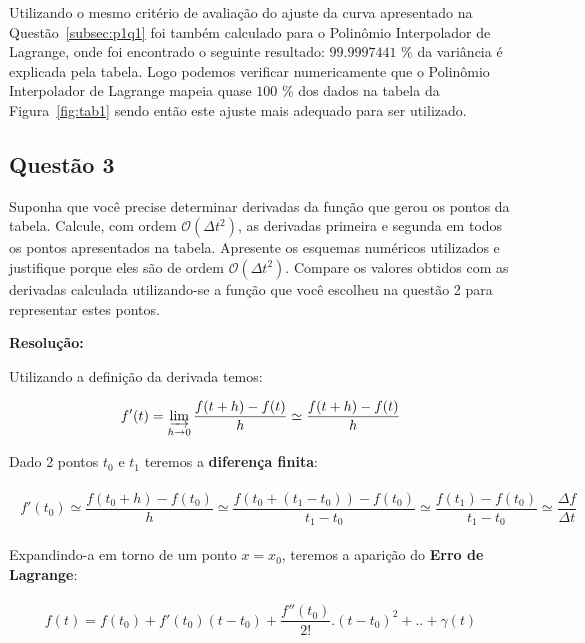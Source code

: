\documentclass[12pt]{article}
\begin{document}
Utilizando o mesmo critério de avaliação do ajuste da curva apresentado na Questão~\ref{subsec:p1q1} foi também calculado para o Polinômio Interpolador de Lagrange, onde foi encontrado o seguinte resultado: $99.9997441$ \% da variância é explicada pela tabela. Logo podemos verificar numericamente que o Polinômio Interpolador de Lagrange mapeia quase $100$ \% dos dados na tabela da Figura~\ref{fig:tab1} sendo então este ajuste mais adequado para ser utilizado.

\subsection{Questão 3}
\label{subsec:p1q3}

Suponha que você precise determinar derivadas da função que gerou os pontos da tabela. Calcule, com ordem $\mathcal{O}(\Delta t^{2})$, as derivadas primeira e segunda em todos os pontos apresentados na tabela. Apresente os esquemas numéricos utilizados e justifique porque eles são de ordem $\mathcal{O}(\Delta t^{2})$. Compare os valores obtidos com as derivadas calculada utilizando-se a função que você escolheu na questão 2 para representar estes pontos.

\textbf{Resolução:}

Utilizando a definição da derivada temos:

\begin{eqnarray}
\begin{split}
f'(t) = \varinjlim_{h \rightarrow 0} \dfrac{f(t + h) - f(t)}{h} \simeq \dfrac{f(t + h) - f(t)}{h}
\end{split}
\label{eq:d}
\end{eqnarray}

Dado 2 pontos $t_{0}$ e $t_{1}$ teremos a \textbf{diferença finita}:

\begin{eqnarray}
\begin{split}
f'(t_{0}) \simeq \dfrac{f(t_{0} + h) - f(t_{0})}{h} \simeq \dfrac{f(t_{0} + (t_{1} - t_{0})) - f(t_{0})}{t_{1} - t_{0}} \simeq \dfrac{f(t_{1}) - f(t_{0})}{t_{1} - t_{0}} \simeq \dfrac{\Delta f}{\Delta t}
\end{split}
\label{eq:dp}
\end{eqnarray}

Expandindo-a em torno de um ponto $x=x_{0}$, teremos a aparição do \textbf{Erro de Lagrange}:

\begin{eqnarray}
\begin{split}
f(t) = f(t_{0}) + f'(t_{0})(t - t_{0}) + \dfrac{f''(t_{0})}{2!}.(t - t_{0})^{2} + .. + \gamma (t)
\end{split}
\label{eq:dexp}
\end{eqnarray}
\end{document}
